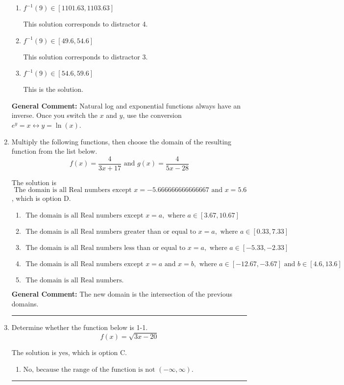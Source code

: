 \documentclass{extbook}[14pt]
\newcommand{\litem}[1]{\item #1

\rule{\textwidth}{0.4pt}}
\begin{document}
\begin{enumerate}
{\begin{enumerate}[label=\Alph*.]
 This solution corresponds to distractor 2.
\item \( f^{-1}(9) \in [1101.63, 1103.63] \)

 This solution corresponds to distractor 4.
\item \( f^{-1}(9) \in [49.6, 54.6] \)

 This solution corresponds to distractor 3.
\item \( f^{-1}(9) \in [54.6, 59.6] \)

 This is the solution.
\end{enumerate}

\textbf{General Comment:} Natural log and exponential functions always have an inverse. Once you switch the $x$ and $y$, use the conversion $ e^y = x \leftrightarrow y=\ln(x)$.
}
\litem{
Multiply the following functions, then choose the domain of the resulting function from the list below.
\[ f(x) = \frac{4}{3x+17} \text{ and } g(x) = \frac{4}{5x-28} \]

The solution is \( \text{ The domain is all Real numbers except } x = -5.666666666666667 \text{ and } x = 5.6 \), which is option D.\begin{enumerate}[label=\Alph*.]
\item \( \text{ The domain is all Real numbers except } x = a, \text{ where } a \in [3.67, 10.67] \)


\item \( \text{ The domain is all Real numbers greater than or equal to } x = a, \text{ where } a \in [0.33, 7.33] \)


\item \( \text{ The domain is all Real numbers less than or equal to } x = a, \text{ where } a \in [-5.33, -2.33] \)


\item \( \text{ The domain is all Real numbers except } x = a \text{ and } x = b, \text{ where } a \in [-12.67, -3.67] \text{ and } b \in [4.6, 13.6] \)


\item \( \text{ The domain is all Real numbers. } \)


\end{enumerate}

\textbf{General Comment:} The new domain is the intersection of the previous domains.
}
\litem{
Determine whether the function below is 1-1.
\[ f(x) = \sqrt{3 x - 20} \]

The solution is \( \text{yes} \), which is option C.\begin{enumerate}[label=\Alph*.]
\item \( \text{No, because the range of the function is not $(-\infty, \infty)$.} \)


\end{enumerate}}
\end{enumerate}
\end{document}
